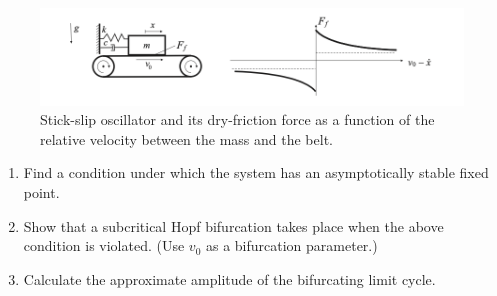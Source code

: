 \begin{exercise}
\begin{figure}[h!]
	\includegraphics[width = \textwidth]{figures/ch3/Series/hopf.png}
\caption{Stick-slip oscillator and its dry-friction force as a function of the relative velocity between the mass and the belt.}
\label{fig:ex52fig2}
\end{figure}
\begin{enumerate}
\item Find a condition under which the system has an asymptotically stable fixed point.
\item Show that a subcritical Hopf bifurcation takes place when the above condition is violated. (Use $v_0$ as a bifurcation parameter.)
\item Calculate the approximate amplitude of the bifurcating limit cycle.
\end{enumerate}
\end{exercise}

